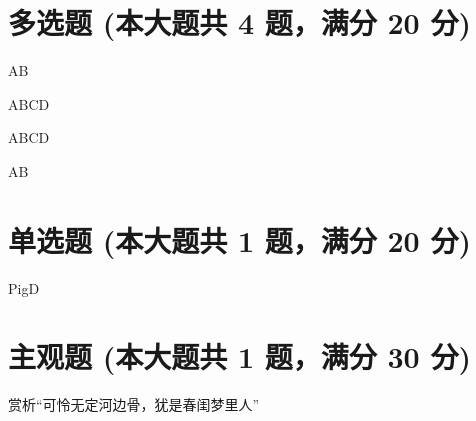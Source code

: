 \documentclass[12pt, a4paper, addpoints, answers]{exam}
\begin{document}
\hspace{5cm}

\section{\normalsize{多选题 (本大题共 4 题，满分 20 分)}}
\hspace{1.5cm}

\begin{questions}
\question[5] AB

\begin{oneparcheckboxes}
\end{oneparcheckboxes}

\question[5] ABCD

\begin{oneparcheckboxes}
\end{oneparcheckboxes}

\question[5] ABCD

\begin{oneparcheckboxes}
\end{oneparcheckboxes}

\question[5] AB

\begin{oneparcheckboxes}
\end{oneparcheckboxes}

\end{questions}

\hspace{5cm}

\section{\normalsize{单选题 (本大题共 1 题，满分 20 分)}}
\hspace{1.5cm}

\begin{questions}
\question[20] PigD

\begin{oneparchoices}
\end{oneparchoices}

\answerline

\end{questions}

\hspace{5cm}

\section{\normalsize{主观题 (本大题共 1 题，满分 30 分)}}
\hspace{1.5cm}

\begin{questions}
\question[30] 赏析“可怜无定河边骨，犹是春闺梦里人”


   

\end{questions}
\end{document}
